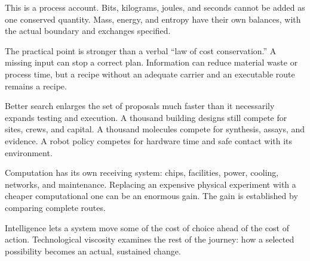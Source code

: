 This is a process account. Bits, kilograms, joules, and seconds cannot be added as one conserved quantity. Mass, energy, and entropy have their own balances, with the actual boundary and exchanges specified.

The practical point is stronger than a verbal “law of cost conservation.” A missing input can stop a correct plan. Information can reduce material waste or process time, but a recipe without an adequate carrier and an executable route remains a recipe.


Better search enlarges the set of proposals much faster than it necessarily expands testing and execution. A thousand building designs still compete for sites, crews, and capital. A thousand molecules compete for synthesis, assays, and evidence. A robot policy competes for hardware time and safe contact with its environment.

Computation has its own receiving system: chips, facilities, power, cooling, networks, and maintenance. Replacing an expensive physical experiment with a cheaper computational one can be an enormous gain. The gain is established by comparing complete routes.

Intelligence lets a system move some of the cost of choice ahead of the cost of action. Technological viscosity examines the rest of the journey: how a selected possibility becomes an actual, sustained change.
